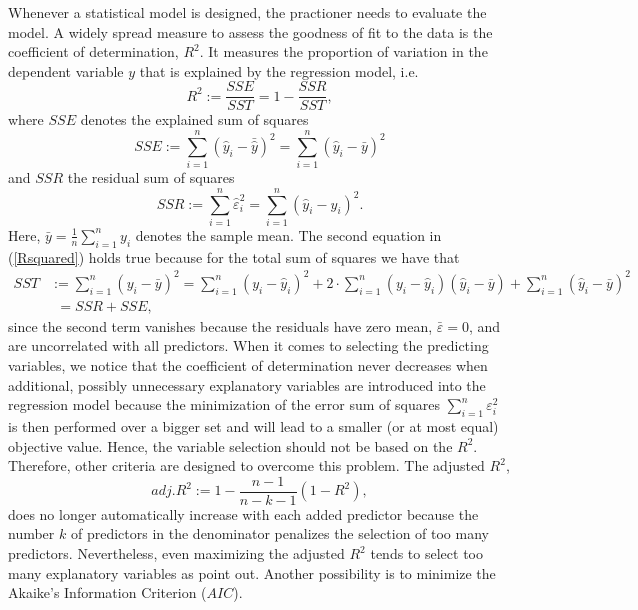 \documentclass[a4paper, 12pt]{scrreprt}
\begin{document}
Whenever a statistical model is designed, the practioner needs to evaluate the model. A widely spread measure to assess the goodness of fit to the data is the coefficient of determination, $R^2$. It measures the proportion of variation in the dependent variable $y$ that is explained by the regression model, i.e.
\begin{equation}\label{Rsquared}
R^2 := \frac{SSE}{SST} = 1 - \frac{SSR}{SST},
\end{equation}
where $SSE$ denotes the explained sum of squares
\begin{equation}\label{SSE}
SSE := \sum_{i=1}^n (\hat{y}_i - \bar{\hat{y}})^2 = \sum_{i=1}^n (\hat{y}_i - \bar{y})^2
\end{equation}
and $SSR$ the residual sum of squares
\begin{equation}\label{SSR}
SSR := \sum_{i=1}^n \hat{\varepsilon}_i^2 = \sum_{i=1}^n (\hat{y}_i - y_i)^2. 
\end{equation}
Here, $\bar{y} = \frac{1}{n} \sum_{i=1}^n y_i$ denotes the sample mean.
The second equation in (\ref{Rsquared}) holds true because for the total sum of squares we have that
\begin{align} SST &:= \sum_{i=1}^n (y_i - \bar{y})^2 = \sum_{i=1}^n (y_i - \hat{y}_i)^2 + 2 \cdot \sum_{i=1}^n (y_i - \hat{y}_i)(\hat{y}_i - \bar{y}) + \sum_{i=1}^n (\hat{y}_i - \bar{y})^2 \nonumber \\
&\phantom{:}= SSR + SSE,
\end{align}
since the second term vanishes because the residuals have zero mean, $\bar{\varepsilon} = 0$, and are uncorrelated with all predictors.
When it comes to selecting the predicting variables, we notice that the coefficient of determination never decreases when additional, possibly unnecessary explanatory variables are introduced into the regression model because the minimization of the error sum of squares $\sum_{i=1}^n \varepsilon_i^2$ is then performed over a bigger set and will lead to a smaller (or at most equal) objective value.
Hence, the variable selection should not be based on the $R^2$. Therefore, other criteria are designed to overcome this problem. The adjusted $R^2$,
\begin{equation}
adj. R^2 := 1 - \frac{n-1}{n-k-1}(1-R^2), 
\end{equation}
does no longer automatically increase with each added predictor because the number $k$ of predictors in the denominator penalizes the selection of too many predictors.
Nevertheless, even maximizing the adjusted $R^2$ tends to select too many explanatory variables as \textcite[chapter 5.3]{hyndman2014forecasting} point out.
Another possibility is to minimize the Akaike's Information Criterion ($AIC$).
\end{document}
